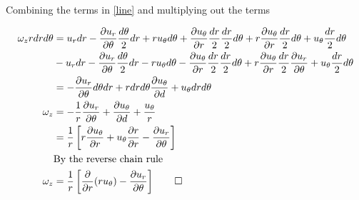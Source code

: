 \documentclass[11pt,twoside]{article}
\newcommand{\p}[2]{\frac{\partial#1}{\partial#2}}
\begin{document}
\begin{enumerate}
\begin{enumerate}
Combining the terms in \autoref{line} and multiplying out the terms 

\begin{align*}
\omega_zrdrd\theta &= 
u_rdr-\p{u_r}{\theta}\frac{d\theta}{2}dr+
ru_\theta d\theta+
\p{u_\theta}{r}\frac{dr}{2}\frac{dr}{2}d\theta+
r\p{u_\theta}{r}\frac{dr}{2}d\theta+
u_\theta\frac{dr}{2}d\theta \\
& - u_rdr
-\p{u_r}{\theta}\frac{d\theta}{2}dr
-ru_\theta d\theta
-\p{u_\theta}{r}\frac{dr}{2}\frac{dr}{2} d\theta
+ r\p{u_\theta}{r}\frac{dr}{2}\p{u_r}{\theta}
+u_\theta\frac{dr}{2}d\theta \\
&= -\p{u_r}{\theta}d\theta dr + rdrd\theta\p{u_\theta}{d} + u_\theta drd\theta\\
\omega_z & = -\frac{1}{r}\p{u_r}{\theta} + \p{u_\theta}{d} + \frac{u_\theta}{r}\\
         & = \frac{1}{r}\left[ r\p{u_\theta}{r} + u_\theta\p{r}{r} - \p{u_r}{\theta}\right]\\
         & \mbox{By the reverse chain rule}\\
\omega_z & = \frac{1}{r}\left[ \p{}{r}(r u_\theta) - \p{u_r}{\theta}\right]\qed
\end{align*}

\end{enumerate}



\end{enumerate}
\end{document}
